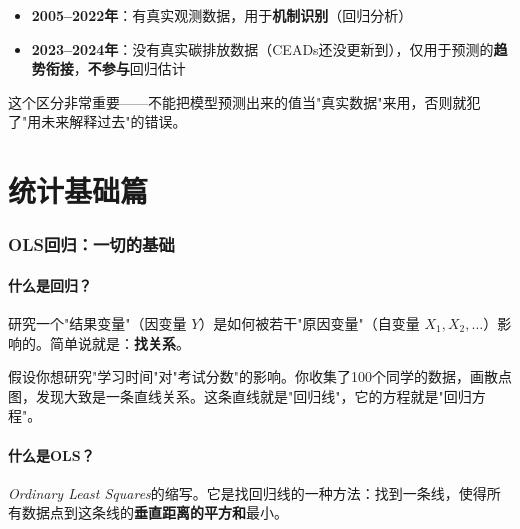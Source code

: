 \documentclass[12pt, a4paper]{article}
\begin{document}
\begin{warningbox}[论文的一个关键区分]
\begin{itemize}[leftmargin=2em]
\item \textbf{2005--2022年}：有真实观测数据，用于\textbf{机制识别}（回归分析）
\item \textbf{2023--2024年}：没有真实碳排放数据（CEADs还没更新到），仅用于预测的\textbf{趋势衔接}，\textbf{不参与}回归估计
\end{itemize}
这个区分非常重要——不能把模型预测出来的值当"真实数据"来用，否则就犯了"用未来解释过去"的错误。
\end{warningbox}

\part{统计基础篇}

\section{OLS回归：一切的基础}

\subsection{什么是回归？}

\begin{conceptbox}[回归分析]
研究一个"结果变量"（因变量 $Y$）是如何被若干"原因变量"（自变量 $X_1, X_2, \ldots$）影响的。简单说就是：\textbf{找关系}。
\end{conceptbox}

\begin{examplebox}[生活中的回归]
假设你想研究"学习时间"对"考试分数"的影响。你收集了100个同学的数据，画散点图，发现大致是一条直线关系。这条直线就是"回归线"，它的方程就是"回归方程"。
\end{examplebox}

\subsection{什么是OLS？}

\begin{conceptbox}
\textit{Ordinary Least Squares}的缩写。它是找回归线的一种方法：找到一条线，使得所有数据点到这条线的\textbf{垂直距离的平方和}最小。
\end{conceptbox}
\end{document}
